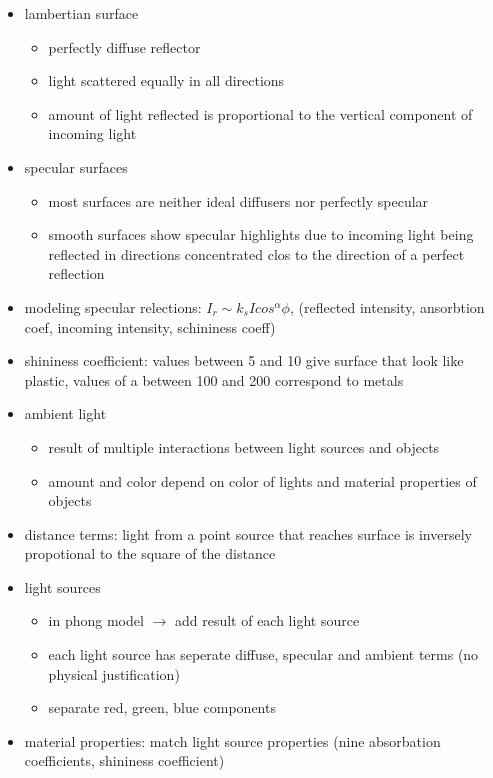 \documentclass[11pt,a4paper]{article}
\begin{document}
\begin{itemize}
\begin{itemize}
	\end{itemize}
	\item lambertian surface
	\begin{itemize}
		\item perfectly diffuse reflector
		\item light scattered equally in all directions
		\item amount of light reflected is proportional to the vertical component of incoming light
	\end{itemize}
	\item specular surfaces
	\begin{itemize}
		\item most surfaces are neither ideal diffusers nor perfectly specular 
		\item smooth surfaces show specular highlights due to incoming light being reflected in directions concentrated clos to the direction of a perfect reflection
	\end{itemize}
	\item modeling specular relections: $I_{r} \sim k_s I cos^{\alpha}\phi$, (reflected intensity, ansorbtion coef, incoming intensity, schininess coeff)
	\item shininess coefficient:	values between 5 and 10 give surface that look like plastic, values of a between 100 and 200 correspond to metals
	\item ambient light
	\begin{itemize}
		\item result of multiple interactions between light sources and objects
		\item amount and color depend on color of lights and material properties of objects
	\end{itemize}
	\item distance terms: light from a point source that reaches surface is inversely propotional to the square of the distance
	\item light sources
	\begin{itemize}
		\item in phong model $\rightarrow$ add result of each light source
		\item each light source has seperate diffuse, specular and ambient terms (no physical justification)
		\item separate red, green, blue components
	\end{itemize}
	\item material properties: match light source properties (nine absorbation coefficients, shininess coefficient)

\end{itemize}
\end{document}
